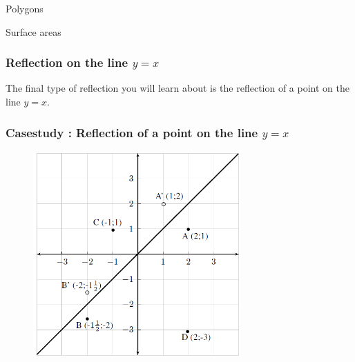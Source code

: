 \begin{exercises}{Polygons}
\begin{exercises}{Surface areas }
{\begin{mdframed}[linewidth=4, leftmargin=40, rightmargin=40]
\begin{exercise}
    \end{exercise}
    \end{mdframed}
    }
    \noindent
  
        
        \label{m39358*uid77754}
            \subsubsection{ Reflection on the line $y=x$}
            \nopagebreak
            
          
          \label{m39358*id71812}The final type of reflection you will learn about is the reflection of a point on the line $y=x$.\par 
\label{m39358*secfhsst!!!underscore!!!id2638}
            \subsubsection{  Casestudy : Reflection of a point on the line $y=x$ }
            \nopagebreak
            
          \label{m39358*id71852}
            
    \setcounter{subfigure}{0}


	\begin{figure}[H] %
    \begin{center}
    \label{m39358*id71857!!!underscore!!!media}\label{m39358*id71857!!!underscore!!!printimage}\includegraphics[width=300px]{col11306.imgs/m39358_MG10C14_029.png} %
        
      \vspace{2pt}
    \vspace{.1in}
    
    \end{center}


\end{figure}
\end{exercises}
\end{exercises}
